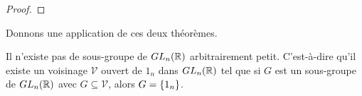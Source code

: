 \ifdefined\outputproof
\begin{proof}

\end{proof}
\fi


Donnons une application de ces deux théorèmes.

\begin{exemple}
	Il n'existe pas de sous-groupe de $GL_{n}(\mathbb{R})$
	arbitrairement petit. C'est-à-dire qu'il existe un voisinage $\mathcal{V}$ ouvert de
	$1_{n}$ dans $GL_{n}(\mathbb{R})$ tel que si $G$ est un
	sous-groupe de $GL_{n}(\mathbb{R})$ avec $G \subseteq
	\mathcal{V}$, alors $G = \left\{ 1_{n} \right\}$.
\end{exemple}
